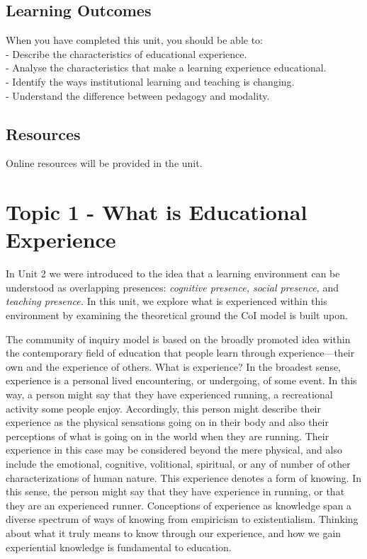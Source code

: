 \documentclass[
]{book}
\begin{document}
\hypertarget{learning-outcomes-3}{%
\subsection*{Learning Outcomes}\label{learning-outcomes-3}}

When you have completed this unit, you should be able to:\\
- Describe the characteristics of educational experience.\\
- Analyse the characteristics that make a learning experience educational.\\
- Identify the ways institutional learning and teaching is changing.\\
- Understand the difference between pedagogy and modality.

\hypertarget{resources-5}{%
\subsection*{Resources}\label{resources-5}}

Online resources will be provided in the unit.

\hypertarget{topic-1---what-is-educational-experience}{%
\section*{Topic 1 - What is Educational Experience}\label{topic-1---what-is-educational-experience}}

In Unit 2 we were introduced to the idea that a learning environment can be understood as overlapping presences: \emph{cognitive presence, social presence,} and \emph{teaching presence.} In this unit, we explore what is experienced within this environment by examining the theoretical ground the CoI model is built upon.

The community of inquiry model is based on the broadly promoted idea within the contemporary field of education that people learn through experience---their own and the experience of others. What is experience? In the broadest sense, experience is a personal lived encountering, or undergoing, of some event. In this way, a person might say that they have experienced running, a recreational activity some people enjoy. Accordingly, this person might describe their experience as the physical sensations going on in their body and also their perceptions of what is going on in the world when they are running. Their experience in this case may be considered beyond the mere physical, and also include the emotional, cognitive, volitional, spiritual, or any of number of other characterizations of human nature. This experience denotes a form of knowing. In this sense, the person might say that they have experience in running, or that they are an experienced runner. Conceptions of experience as knowledge span a diverse spectrum of ways of knowing from empiricism to existentialism. Thinking about what it truly means to know through our experience, and how we gain experiential knowledge is fundamental to education.
\end{document}
